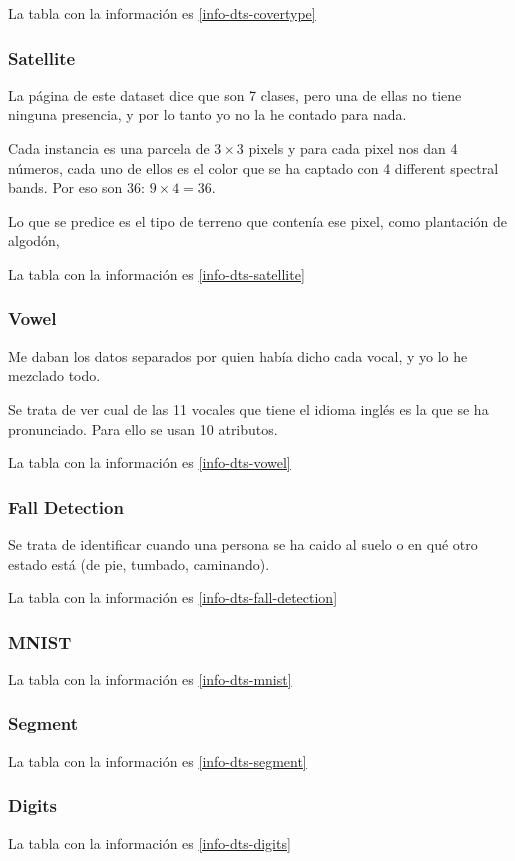 La tabla con la información es \ref{info-dts-covertype}



\subsubsection{Satellite}
\cite[See][]{satellite}

La página de este dataset dice que son 7 clases, pero una de ellas no tiene
ninguna presencia, y por lo tanto yo no la he contado para nada.

Cada instancia es una parcela de $3 \times 3$ pixels y para cada pixel nos
dan 4 números, cada uno de ellos es el color que se ha captado con 4
different spectral bands. Por eso son 36: $9 \times 4 = 36$.

Lo que se predice es el tipo de terreno que contenía ese pixel, como plantación
de algodón,

La tabla con la información es \ref{info-dts-satellite}

\subsubsection{Vowel}
\cite[See][]{vowel}

Me daban los datos separados por quien había dicho cada vocal, y yo lo he
mezclado todo.

Se trata de ver cual de las 11 vocales que tiene el idioma inglés es la que se
ha pronunciado. Para ello se usan 10 atributos.

La tabla con la información es \ref{info-dts-vowel}

\subsubsection{Fall Detection}
\cite[See][]{fall-detection}

Se trata de identificar cuando una persona se ha caido al suelo o en qué otro
estado está (de pie, tumbado, caminando).

La tabla con la información es \ref{info-dts-fall-detection}

\subsubsection{MNIST}
\cite[See][]{mnist}

La tabla con la información es \ref{info-dts-mnist}

\subsubsection{Segment}
\cite[See][]{segment}

La tabla con la información es \ref{info-dts-segment}

\subsubsection{Digits}
\cite[See][]{digits}

La tabla con la información es \ref{info-dts-digits}
